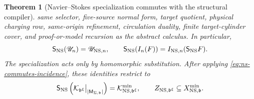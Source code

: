 \documentclass[11pt]{article}
\numberwithin{section}{part}
\theoremstyle{plain}
\newtheorem{theorem}{Theorem}[section]
\theoremstyle{definition}
\theoremstyle{remark}
\begin{document}
\begin{theorem}[Navier--Stokes specialization commutes with the structural
compiler]
same selector, five-source normal form, target quotient, physical charging
row, same-origin refinement, circulation duality, finite target-cylinder
cover, and proof-or-model recursion as the abstract calculus.  In particular,
\begin{equation}
 \label{eq:ns-commutes-computed-covers}
 \mathsf S_{\rm NS}(\mathscr U_n)
 =\mathscr U_{{\rm NS},n},
 \qquad
 \mathsf S_{\rm NS}(I_n(F))
 =I_{{\rm NS},n}(\mathsf S_{\rm NS}F).
\end{equation}
The specialization acts only by homomorphic substitution.
After applying \eqref{eq:ns-commutes-incidence}, these identities restrict to
\[
 \mathsf S_{\rm NS}
 \left(\mathcal K_{\mathfrak b^\xi}
 \big|_{\lvert\mathsf M_{\Sigma,\mathfrak b}\rvert}\right)
 =\mathcal K^{\min}_{{\rm NS},\mathfrak b^\xi},
 \qquad
 Z_{{\rm NS},\mathfrak b^\xi}
 \subseteq X^{\min}_{{\rm NS},\mathfrak b}.
\]
\end{theorem}
\end{document}
